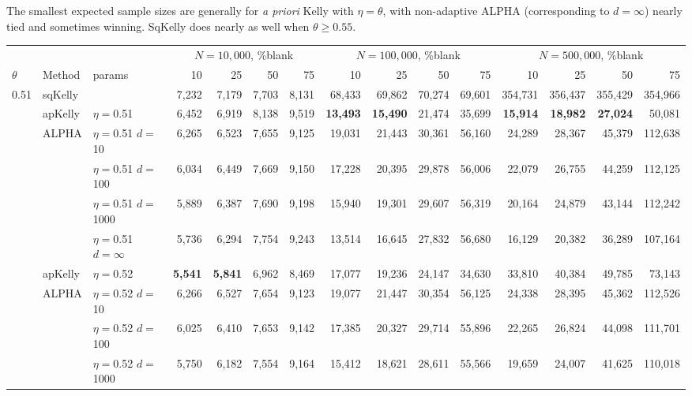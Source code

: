 \documentclass[12pt,runningheads]{llncs}
\begin{document}
{The smallest expected sample sizes are generally for \emph{a priori} Kelly with $\eta=\theta$, with non-adaptive ALPHA (corresponding to
$d=\infty$) nearly tied and sometimes winning.
SqKelly does nearly as well when $\theta \ge 0.55$.

\begin{table}
\centering
\tiny
\begin{tabular}{lll|rrrr|rrrr|rrrr} 
& & & \multicolumn{4}{|c|}{$N=10{,}000$, \%blank} &  \multicolumn{4}{|c|}{$N=100{,}000$, \%blank} & \multicolumn{4}{|c}{$N=500{,}000$, \%blank} \\ 
$\theta$ & Method & params & 10 & 25 & 50 & 75  & 10 & 25 & 50 & 75  & 10 & 25 & 50 & 75  \\
\hline 0.51 & sqKelly & & 7,232  & 7,179  & 7,703  & 8,131  & 68,433  & 69,862  & 70,274  & 69,601  & 354,731  & 356,437  & 355,429  & 354,966  \\
\cline{2-15} & apKelly & $\eta=$0.51 & 6,452  & 6,919  & 8,138  & 9,519  & \bf{13,493}  & \bf{15,490}  & 21,474  & 35,699  & \bf{15,914}  & \bf{18,982}  & \bf{27,024}  & 50,081  \\
\cline{2-15}
& ALPHA & $\eta=$0.51 $d=$10 & 6,265  & 6,523  & 7,655  & 9,125  & 19,031  & 21,443  & 30,361  & 56,160  & 24,289  & 28,367  & 45,379  & 112,638  \\
&  & $\eta=$0.51 $d=$100 & 6,034  & 6,449  & 7,669  & 9,150  & 17,228  & 20,395  & 29,878  & 56,006  & 22,079  & 26,755  & 44,259  & 112,125  \\
&  & $\eta=$0.51 $d=$1000 & 5,889  & 6,387  & 7,690  & 9,198  & 15,940  & 19,301  & 29,607  & 56,319  & 20,164  & 24,879  & 43,144  & 112,242  \\
 &  & $\eta=$0.51 $d=\infty$ & 5,736  & 6,294  & 7,754  & 9,243  & 13,514  & 16,645  & 27,832  & 56,680  & 16,129  & 20,382  & 36,289  & 107,164  \\
\cline{2-15} & apKelly & $\eta=$0.52 & \bf{5,541}  & \bf{5,841}  & 6,962  & 8,469  & 17,077  & 19,236  & 24,147  & 34,630  & 33,810  & 40,384  & 49,785  & 73,143  \\
\cline{2-15}
& ALPHA & $\eta=$0.52 $d=$10 & 6,266  & 6,527  & 7,654  & 9,123  & 19,077  & 21,447  & 30,354  & 56,125  & 24,338  & 28,395  & 45,362  & 112,526  \\
&  & $\eta=$0.52 $d=$100 & 6,025  & 6,410  & 7,653  & 9,142  & 17,385  & 20,327  & 29,714  & 55,896  & 22,265  & 26,824  & 44,098  & 111,701  \\
&  & $\eta=$0.52 $d=$1000 & 5,750  & 6,182  & 7,554  & 9,164  & 15,412  & 18,621  & 28,611  & 55,566  & 19,659  & 24,007  & 41,625  & 110,018  \\

\end{tabular}
\end{table}}
\end{document}
